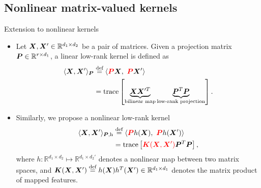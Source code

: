 \documentclass[compress,dvipsnames]{beamer}
\let\olditem\item
\renewcommand\item{\olditem\justifying}
\begin{document}
\subsection{Nonlinear matrix-valued kernels}
\begin{frame}{Extension to nonlinear kernels}
\begin{itemize}
\item Let $\bm{X},\bm{X}'\in\mathbb{R}^{d_1\times d_2}$ be a pair of matrices. Given a projection matrix $\bm{P}\in\mathbb{R}^{r\times d_1}$, {\color{red}a linear low-rank kernel} is defined as
\begin{align}
\langle \mX, \mX' \rangle_{\mP}&\stackrel{\text{def}}{=} \langle {\color{red}\mP} \mX,\ {\color{red}\mP} \mX'\rangle\\
&= \text{trace}\left[\KeepStyleUnderBrace{\mX\mX'^T}_{\text{bilinear map}}\KeepStyleUnderBrace{\mP^T\mP}_{\text{low-rank projection}}\right].
\end{align}
\item Similarly, we propose {\color{red}a nonlinear low-rank kernel}
\begin{align}
\langle \bm{X}, \bm{X}' \rangle_{\text{$\bm{P}$,h}}&\stackrel{\text{def}}{=} \langle {\color{red}\bm{P}} h(\bm{X}),\ {\color{red}\bm{P}} h(\bm{X}')\rangle\\
&=\text{trace}\left[{\color{red}\bm{K}(\bm{X},\bm{X}')}\bm{P}^T\bm{P}\right],
\end{align}
where $h\colon \mathbb{R}^{d_1\times d_2}\mapsto \mathbb{R}^{d_1\times d_2'}$ denotes a nonlinear map between two matrix spaces, and $\bm{K}(\bm{X},\bm{X}')\stackrel{\text{def}}{=}h(\bm{X})h^T(\bm{X}')\in\mathbb{R}^{d_1\times d_1}$ denotes the matrix product of mapped features. 
\end{itemize}
\end{frame}
\end{document}
